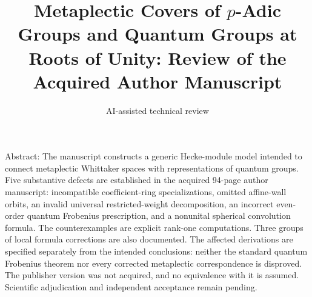 \documentclass[10pt]{article}
\title{Metaplectic Covers of \(p\)-Adic Groups and Quantum Groups at Roots of Unity:
Review of the Acquired Author Manuscript}
\author{AI-assisted technical review}
\date{}
\begin{document}
\maketitle
Abstract: The manuscript constructs a generic Hecke-module model intended to connect metaplectic Whittaker spaces with representations of quantum groups. Five substantive defects are established in the acquired 94-page author manuscript: incompatible coefficient-ring specializations, omitted affine-wall orbits, an invalid universal restricted-weight decomposition, an incorrect even-order quantum Frobenius prescription, and a nonunital spherical convolution formula. The counterexamples are explicit rank-one computations. Three groups of local formula corrections are also documented. The affected derivations are specified separately from the intended conclusions: neither the standard quantum Frobenius theorem nor every corrected metaplectic correspondence is disproved. The publisher version was not acquired, and no equivalence with it is assumed. Scientific adjudication and independent acceptance remain pending.\par
\end{document}
